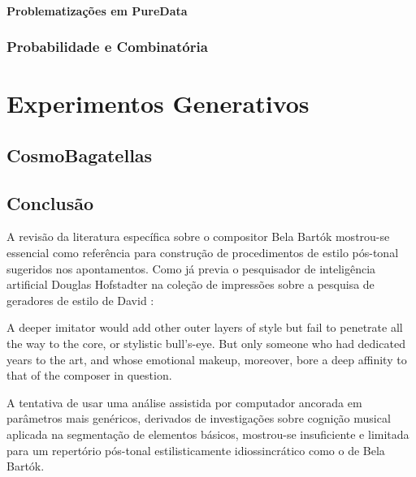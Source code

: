 \documentclass[
	12pt,				%
	openright,			%
	twoside,			%
	a4paper,			%
	english,			%
	french,				%
	spanish,			%
	brazil				%
	]{abntex2}
\begin{document}
\subsection{Problematizações em PureData}

\section{Probabilidade e Combinatória}




\part{Experimentos Generativos}

\chapter{CosmoBagatellas}




\chapter*[Conclusão]{Conclusão}
\label{conclusao}

A revisão da literatura específica sobre o compositor Bela Bartók mostrou-se essencial como referência para construção de procedimentos de estilo pós-tonal sugeridos nos apontamentos. Como já previa o pesquisador de inteligência artificial Douglas Hofstadter na coleção de impressões sobre a pesquisa de geradores de estilo de David  :

\begin{citacao}
A deeper imitator would add other outer layers of style but
fail to penetrate all the way to the core, or stylistic bull's-eye. But only someone who
had dedicated years to the art, and whose emotional makeup, moreover, bore a deep
affinity to that of the composer in question.\cite[ p.54]{cope2004virtual}
\end{citacao}


A tentativa de usar uma análise assistida por computador ancorada em parâmetros mais genéricos, derivados de investigações sobre cognição musical aplicada na segmentação de elementos básicos, mostrou-se insuficiente e limitada para um repertório pós-tonal estilisticamente idiossincrático como o de Bela Bartók.
\end{document}
